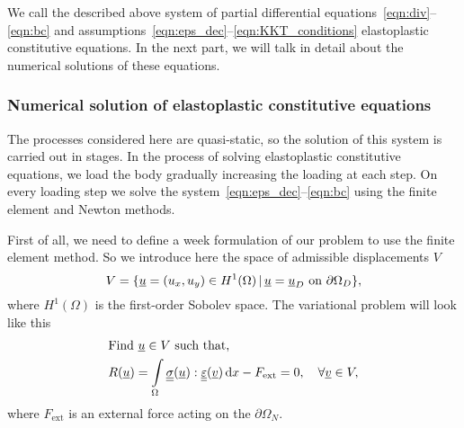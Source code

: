 \documentclass[12pt]{article}
\begin{document}
We call the described above system of partial differential equations~\ref{eqn:div}--\ref{eqn:bc} and assumptions~\ref{eqn:eps_dec}--\ref{eqn:KKT_conditions} elastoplastic constitutive equations. In the next part, we will talk in detail about the numerical solutions of these equations.

\subsubsection{Numerical solution of elastoplastic constitutive equations}

The processes considered here are quasi-static, so the solution of this system is carried out in stages. In the process of solving elastoplastic constitutive equations, we load the body gradually increasing the loading at each step. On every loading step we solve the system~\ref{eqn:eps_dec}--\ref{eqn:bc} using the finite element and Newton methods. 

First of all, we need to define a week formulation of our problem to use the finite element method. So we introduce here the space of admissible displacements $V$
\begin{equation}
    V = \{\underline{u} = (u_x, u_y) \in H^1(\Omega) \, | \, \underline{u} = \underline{u}_D \text{ on } \partial\Omega_D \},
\end{equation}
where $H^1(\Omega)$ is the first-order Sobolev space. The variational problem will look like this 
\begin{align}
    & \text{Find } \underline{u} \in V \text{ such that,} \label{eqn:var_from_1} \\ 
    & R(\underline{u}) = \int\limits_\Omega\underline{\underline{\sigma}}(\underline{u}) : \underline{\underline{\varepsilon}}(\underline{v}) \, \mathrm{d} x - F_\text{ext} = 0, \quad \forall \underline{v} \in V \label{eqn:var_from_2},
\end{align}
where $F_\text{ext}$ is an external force acting on the $\partial\Omega_N$.
\end{document}
